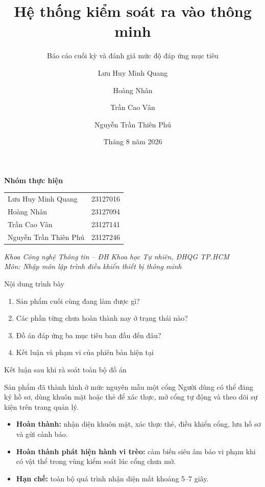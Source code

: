 \documentclass[aspectratio=169,11pt]{beamer}
\title[Kiểm soát ra vào AIoT]{Hệ thống kiểm soát ra vào thông minh}
\subtitle{Báo cáo cuối kỳ và đánh giá mức độ đáp ứng mục tiêu}
\author[Nhóm thực hiện]{Lưu Huy Minh Quang \and Hoàng Nhân \and Trần Cao Vân \and Nguyễn Trần Thiên Phú}
\institute[HCMUS]{Khoa Công nghệ Thông tin\\Đại học Khoa học Tự nhiên, ĐHQG TP.HCM}
\date[Tháng 8 năm 2026]{Tháng 8 năm 2026}
\begin{document}
\begin{frame}[c]
  \centering
  {\inserttitle\par}
  \vspace{0.25em}
  {\insertsubtitle\par}

  \vspace{1em}
  {\large\bfseries Nhóm thực hiện}\par
  \vspace{0.4em}
  \begin{tabular}{ll}
    Lưu Huy Minh Quang & 23127016 \\
    Hoàng Nhân & 23127094 \\
    Trần Cao Vân & 23127141 \\
    Nguyễn Trần Thiên Phú & 23127246
  \end{tabular}

  \vspace{0.75em}
  \textsl{Khoa Công nghệ Thông tin -- ĐH Khoa học Tự nhiên, ĐHQG TP.HCM}\\
  \textsl{Môn: Nhập môn lập trình điều khiển thiết bị thông minh}

  \vspace{0.7em}
  \insertdate
\end{frame}

\begin{frame}{Nội dung trình bày}
  \vspace{1.5em}
  \begin{enumerate}
    \item Sản phẩm cuối cùng đang làm được gì?
    \item Các phần từng chưa hoàn thành nay ở trạng thái nào?
    \item Đồ án đáp ứng ba mục tiêu ban đầu đến đâu?
    \item Kết luận và phạm vi của phiên bản hiện tại
  \end{enumerate}
\end{frame}

\begin{frame}{Kết luận sau khi rà soát toàn bộ đồ án}
  \begin{block}{Sản phẩm đã thành hình ở mức nguyên mẫu một cổng}
    Người dùng có thể đăng ký hồ sơ, dùng khuôn mặt hoặc thẻ để xác thực, mở cổng tự động và theo dõi sự kiện trên trang quản lý.
  \end{block}

  \begin{itemize}
    \item \textbf{\color{Success}Hoàn thành:} nhận diện khuôn mặt, xác thực thẻ, điều khiển cổng, lưu hồ sơ và gửi cảnh báo.
    \item \textbf{\color{Success}Hoàn thành phát hiện hành vi trèo:} cảm biến siêu âm báo vi phạm khi có vật thể trong vùng kiểm soát lúc cổng chưa mở.
    \item \textbf{\color{Warning}Hạn chế:} toàn bộ quá trình nhận diện mất khoảng 5--7 giây.
  \end{itemize}
\end{frame}
\end{document}
